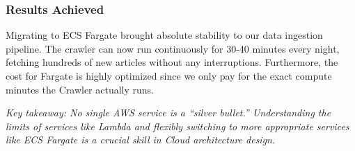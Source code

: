 \hypertarget{results-achieved}{%
\subsubsection{Results Achieved}}

Migrating to ECS Fargate brought absolute stability to our data
ingestion pipeline. The crawler can now run continuously for 30-40
minutes every night, fetching hundreds of new articles without any
interruptions. Furthermore, the cost for Fargate is highly optimized
since we only pay for the exact compute minutes the Crawler actually
runs.

\emph{Key takeaway: No single AWS service is a ``silver bullet.''
Understanding the limits of services like Lambda and flexibly switching
to more appropriate services like ECS Fargate is a crucial skill in
Cloud architecture design.}
